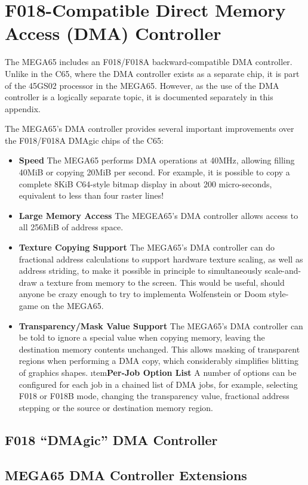 \chapter{F018-Compatible Direct Memory Access (DMA) Controller}
\label{cha:dmagic}

The MEGA65 includes an F018/F018A backward-compatible DMA controller.
Unlike in the C65, where the DMA controller exists as a separate
chip, it is part of the 45GS02 processor in the MEGA65.  However, as the
use of the DMA controller is a logically separate topic, it is documented
separately in this appendix.
 
The MEGA65's DMA controller provides several important improvements over the
F018/F018A DMAgic chips of the C65:
 
\begin{itemize}
\item{\bf Speed} The MEGA65 performs DMA operations at 40MHz, allowing filling 40MiB or copying 20MiB
  per second.  For example, it is possible to copy a complete 8KiB C64-style bitmap display in
  about 200 micro-seconds, equivalent to less than four raster lines!
 \item{\bf Large Memory Access} The MEGEA65's DMA controller allows access to all 256MiB of address space.
\item{\bf Texture Copying Support} The MEGA65's DMA controller can do fractional address calculations
  to support hardware texture scaling, as well as address striding, to make it possible in principle
  to simultaneously scale-and-draw a texture from memory to the screen. This would be useful, should
  anyone be crazy enough to try to implementa Wolfenstein or Doom style-game on the MEGA65.
\item{\bf Transparency/Mask Value Support} The MEGA65's DMA controller can be told to ignore a special value
   when copying memory, leaving the destination memory contents unchanged. This allows masking of transparent
   regions when performing a DMA copy, which considerably simplifies blitting of graphics shapes.
\i tem{\bf Per-Job Option List} A number of options can be configured for each job in a chained list of DMA
  jobs, for example, selecting F018 or F018B mode, changing the transparency value, fractional address stepping
  or the source or destination memory region.
\end{itemize}


\section{F018 ``DMAgic'' DMA Controller}



\section{MEGA65 DMA Controller Extensions}



